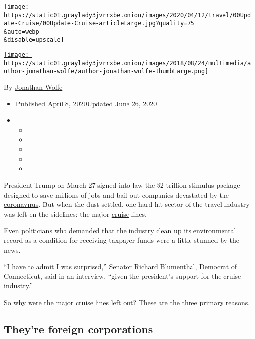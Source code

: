 \texttt{[image: https://static01.graylady3jvrrxbe.onion/images/2020/04/12/travel/00Update-Cruise/00Update-Cruise-articleLarge.jpg?quality=75\\\&auto=webp\\\&disable=upscale]}

\href{https://www.nytimes3xbfgragh.onion/by/jonathan-wolfe}{\texttt{[image: https://static01.graylady3jvrrxbe.onion/images/2018/08/24/multimedia/author-jonathan-wolfe/author-jonathan-wolfe-thumbLarge.png]}}

By \href{https://www.nytimes3xbfgragh.onion/by/jonathan-wolfe}{Jonathan
Wolfe}

\begin{itemize}
\item
  Published April 8, 2020Updated June 26, 2020
\item
  \begin{itemize}
  \item
  \item
  \item
  \item
  \item
  \end{itemize}
\end{itemize}

President Trump on March 27 signed into law the \$2 trillion stimulus
package designed to save millions of jobs and bail out companies
devastated by the
\href{https://www.nytimes3xbfgragh.onion/2020/06/26/travel/coronavirus-cruises-reopening.html}{coronavirus}.
But when the dust settled, one hard-hit sector of the travel industry
was left on the sidelines: the major
\href{https://www.nytimes3xbfgragh.onion/2020/06/26/travel/coronavirus-cruises-reopening.html}{cruise}
lines.

Even politicians who demanded that the industry clean up its
environmental record as a condition for receiving taxpayer funds were a
little stunned by the news.

``I have to admit I was surprised,'' Senator Richard Blumenthal,
Democrat of Connecticut, said in an interview, ``given the president's
support for the cruise industry.''

So why were the major cruise lines left out? These are the three primary
reasons.

\hypertarget{theyre-foreign-corporations}{%
\subsection{They're foreign
corporations}\label{theyre-foreign-corporations}}

